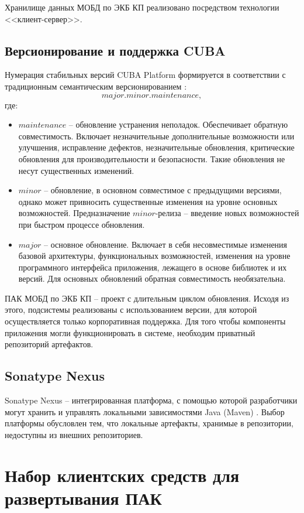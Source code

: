 Хранилище данных МОБД по ЭКБ КП реализовано посредством технологии <<клиент-сервер>>.

\subsection{Версионирование и поддержка CUBA}

Нумерация стабильных версий CUBA Platform формируется в соответствии с традиционным семантическим версионированием \cite{cuba-ver}:
\begin{equation*}
	major.minor.maintenance,
\end{equation*}
где:
\begin{itemize}
	\item  $maintenance$ -- обновление устранения неполадок. Обеспечивает обратную совместимость. Включает незначительные дополнительные возможности или улучшения, исправление дефектов, незначительные обновления, критические обновления для производительности и безопасности. Такие обновления не несут существенных изменений.
	\item $minor$ --  обновление, в основном совместимое с предыдущими версиями, однако может привносить существенные изменения на уровне основных возможностей. Предназначение $minor$-релиза -- введение новых возможностей при быстром процессе обновления.
	\item $major$ -- основное обновление. Включает в себя несовместимые изменения базовой архитектуры, функциональных возможностей, изменения на уровне программного интерфейса приложения, лежащего в основе библиотек и их версий. Для основных обновлений обратная совместимость необязательна.
\end{itemize}
ПАК МОБД по ЭКБ КП -- проект с длительным циклом обновления. Исходя из этого, подсистемы реализованы с использованием версии, для которой осуществляется только корпоративная поддержка. Для того чтобы компоненты приложения могли функционировать в системе, необходим приватный репозиторий артефактов.

\subsection{Sonatype Nexus}
Sonatype Nexus -- интегрированная платформа, с помощью которой разработчики могут хранить и управлять локальными зависимостями Java (Maven) \cite{nexus}. Выбор платформы обусловлен тем, что локальные артефакты, хранимые в репозитории, недоступны из внешних репозиториев.

\section{Набор клиентских средств для развертывания ПАК}

